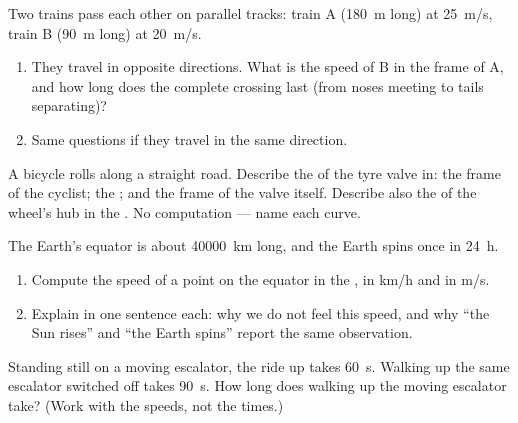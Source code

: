 \begin{exercise}[$\star\star$]\label{exo:g10:relative-motion:8}
Two trains pass each other on parallel tracks: train A (\qty{180}{m}
long) at \qty{25}{m/s}, train B (\qty{90}{m} long) at \qty{20}{m/s}.
\begin{enumerate}
  \item They travel in opposite directions. What is the speed of B in
        the frame of A, and how long does the complete crossing last
        (from noses meeting to tails separating)?
  \item Same questions if they travel in the same direction.
\end{enumerate}
\end{exercise}

\begin{exercise}[$\star\star$]\label{exo:g10:relative-motion:9}
A bicycle rolls along a straight road. Describe the  of the
tyre valve in: the frame of the cyclist; the ; and the frame
of the valve itself. Describe also the  of the wheel's hub in
the . No computation --- name each curve.
\end{exercise}

\begin{exercise}[$\star\star$]\label{exo:g10:relative-motion:10}
The Earth's equator is about \qty{40000}{km} long, and the Earth spins
once in \qty{24}{h}.
\begin{enumerate}
  \item Compute the speed of a point on the equator in the , in \unit{km/h} and in \unit{m/s}.
  \item Explain in one sentence each: why we do not feel this speed, and
        why ``the Sun rises'' and ``the Earth spins'' report the same
        observation.
\end{enumerate}
\end{exercise}

\begin{exercise}[$\star\star$]\label{exo:g10:relative-motion:11}
Standing still on a moving escalator, the ride up takes \qty{60}{s}.
Walking up the same escalator switched off takes \qty{90}{s}. How long
does walking up the moving escalator take? (Work with the speeds, not
the times.)
\end{exercise}

